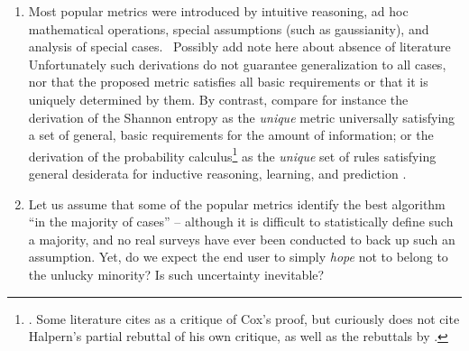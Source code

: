 \documentclass[\ifafour a4paper,12pt,\else a5paper,10pt,\fi%
onecolumn,oneside,article,%
british%
]{memoir}
\theoremstyle{remark}
\theoremstyle{innote}
\renewcommand*{\|}[1][]{\nonscript\:#1\vert\nonscript\:\mathopen{}}
\newcommand*{\sect}{\S}%
\newcommand*{\chap}{ch.}%
\newcommand*{\chaps}{chs}%
\newcommand*{\puzzle}{{\fontencoding{U}\fontfamily{fontawesometwo}\selectfont\symbol{225}}}
\newcommand{\mynoteu}[1]{{\footnotesize\color{notecolour}\puzzle\ #1}}
\begin{document}
\begin{enumerate}
\item\label{item:ad_hoc} Most popular metrics were introduced by intuitive reasoning, ad hoc mathematical operations, special assumptions (such as gaussianity\autocites[e.g.][\sect~31 p.~183 for the Matthews correlation coefficient]{fisher1925_r1963}), and analysis of special cases. \mynoteu{Possibly add note here about absence of literature} Unfortunately such derivations do not guarantee generalization to all cases, nor that the proposed metric satisfies all basic requirements or that it is uniquely determined by them. By contrast, compare for instance the derivation of the Shannon entropy \autocites{shannon1948}[\sect~3.2]{woodward1953_r1964}[also][]{goodetal1968} as the \emph{unique} metric universally satisfying a set of general, basic requirements for the amount of information; or the derivation of the probability calculus\footnote{\cites{cox1946,fine1973}[\chaps~1--2]{jaynes1994_r2003}. Some literature cites \textcites{halpern1999} as a critique of Cox's proof, but curiously does not cite Halpern's \parencites*{halpern1999b} partial rebuttal of his own critique, as well as the rebuttals by \textcites{snow1998,snow2001}.} as the \emph{unique} set of rules satisfying general desiderata for inductive reasoning, learning, and prediction \autocites{selfetal1987,cheeseman1988}[\chap~12]{russelletal1995_r2022}.
  
\item\label{item:hope_medical} Let us assume that some of the popular metrics identify the best algorithm \enquote{in the majority of cases} -- although it is difficult to statistically define such a majority, and no real surveys have ever been conducted to back up such an assumption. Yet, do we expect the end user to simply \emph{hope} not to belong to the unlucky minority? Is such uncertainty inevitable?


\end{enumerate}
\end{document}
